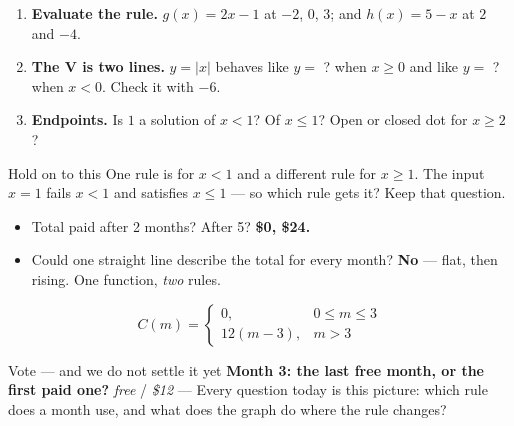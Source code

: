 \documentclass[aspectratio=169, 11pt]{beamer}
\begin{document}
\begin{frame}[t, plain]
  \begin{enumerate}\setlength{\itemsep}{7pt}
    \item \textbf{Evaluate the rule.} $g(x)=2x-1$ at $-2$, $0$, $3$; and $h(x)=5-x$ at $2$
          and $-4$.
    \item \textbf{The V is two lines.} $y=|x|$ behaves like $y=$ ? when $x\ge0$ and like $y=$ ?
          when $x<0$. Check it with $-6$.
    \item \textbf{Endpoints.} Is $1$ a solution of $x<1$? Of $x\le1$? Open or closed dot for
          $x\ge2$?
  \end{enumerate}
  \vspace{6pt}
  \begin{block}{Hold on to this}
    One rule is for $x<1$ and a different rule for $x\ge1$. The input $x=1$ fails $x<1$ and
    satisfies $x\le1$ --- so which rule gets it? Keep that question.
  \end{block}
\end{frame}

\begin{frame}[t, plain]
  \begin{itemize}\setlength{\itemsep}{5pt}
    \item Total paid after 2 months? After 5? \; \textbf{\$0, \$24.}
    \item Could one straight line describe the total for every month? \; \textbf{No} --- flat,
          then rising. One function, \emph{two} rules.
  \end{itemize}
  \[ C(m)=\begin{cases} 0, & 0\le m\le 3 \\ 12(m-3), & m>3 \end{cases} \]
  \begin{block}{Vote --- and we do not settle it yet}
    \textbf{Month 3: the last free month, or the first paid one?} \quad \emph{free} \; / \;
    \emph{\$12} \quad --- Every question today is this picture: which rule does a month use, and
    what does the graph do where the rule changes?
  \end{block}
\end{frame}
\end{document}
